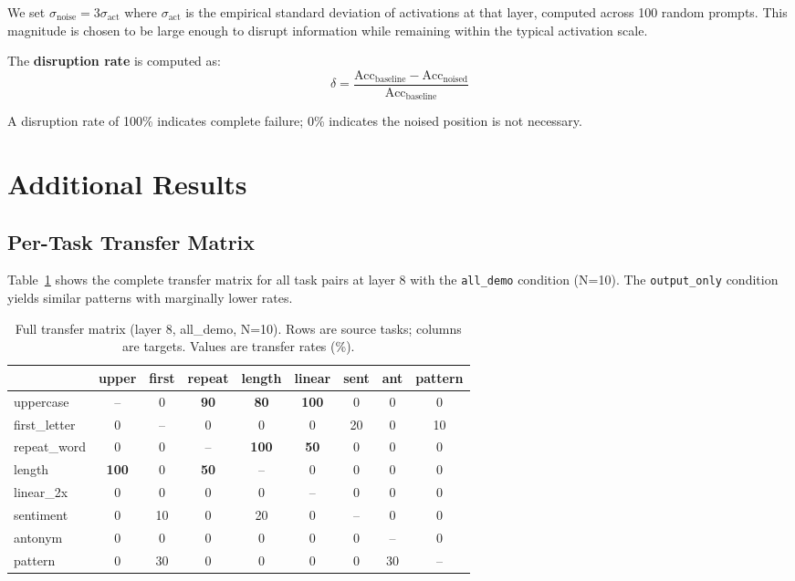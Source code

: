 \documentclass[sigconf,anonymous]{acmart}
\begin{document}
We set $\sigma_\text{noise} = 3\sigma_\text{act}$ where $\sigma_\text{act}$ is the empirical standard deviation of activations at that layer, computed across 100 random prompts. This magnitude is chosen to be large enough to disrupt information while remaining within the typical activation scale.

The \textbf{disruption rate} is computed as:
\begin{equation}
    \delta = \frac{\text{Acc}_\text{baseline} - \text{Acc}_\text{noised}}{\text{Acc}_\text{baseline}}
\end{equation}

A disruption rate of 100\% indicates complete failure; 0\% indicates the noised position is not necessary.

\section{Additional Results}
\label{app:results}

\subsection{Per-Task Transfer Matrix}

Table~\ref{tab:full_transfer} shows the complete transfer matrix for all task pairs at layer 8 with the \texttt{all\_demo} condition (N=10). The \texttt{output\_only} condition yields similar patterns with marginally lower rates.

\begin{table}[h]
\centering
\small
\caption{Full transfer matrix (layer 8, all\_demo, N=10). Rows are source tasks; columns are targets. Values are transfer rates (\%).}
\label{tab:full_transfer}
\begin{tabular}{@{}lcccccccc@{}}
\toprule
& upper & first & repeat & length & linear & sent & ant & pattern \\
\midrule
uppercase & -- & 0 & \textbf{90} & \textbf{80} & \textbf{100} & 0 & 0 & 0 \\
first\_letter & 0 & -- & 0 & 0 & 0 & 20 & 0 & 10 \\
repeat\_word & 0 & 0 & -- & \textbf{100} & \textbf{50} & 0 & 0 & 0 \\
length & \textbf{100} & 0 & \textbf{50} & -- & 0 & 0 & 0 & 0 \\
linear\_2x & 0 & 0 & 0 & 0 & -- & 0 & 0 & 0 \\
sentiment & 0 & 10 & 0 & 20 & 0 & -- & 0 & 0 \\
antonym & 0 & 0 & 0 & 0 & 0 & 0 & -- & 0 \\
pattern & 0 & 30 & 0 & 0 & 0 & 0 & 30 & -- \\
\bottomrule
\end{tabular}
\end{table}
\end{document}

